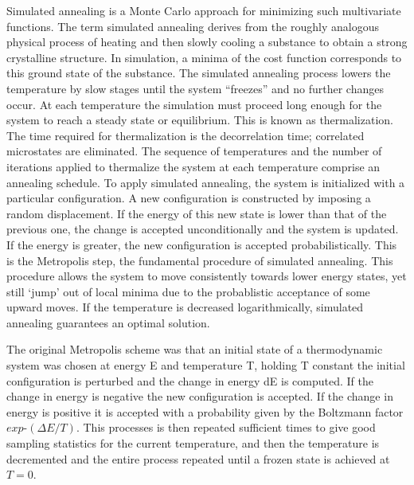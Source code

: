 \documentclass[superscriptaddress,reprint,amsmath,amssymb,aps]{revtex4-1}
\begin{document}

\vspace{.15in}

Simulated annealing is a Monte Carlo approach for minimizing such
multivariate functions. The term simulated annealing derives from the
roughly analogous physical process of heating and then slowly cooling a
substance to obtain a strong crystalline structure. In simulation, a minima
of the cost function corresponds to this ground state of the substance. The
simulated annealing process lowers the temperature by slow stages until the
system ``freezes'' and no further changes occur. At each temperature the
simulation must proceed long enough for the system to reach a steady state
or equilibrium. This is known as thermalization. The time required for
thermalization is the decorrelation time; correlated microstates are
eliminated. The sequence of temperatures and the number of iterations
applied to thermalize the system at each temperature comprise an annealing
schedule.  To apply simulated annealing, the system is initialized with a
particular configuration. A new configuration is constructed by imposing a
random displacement. If the energy of this new state is lower than that of
the previous one, the change is accepted unconditionally and the system is
updated. If the energy is greater, the new configuration is accepted
probabilistically. This is the Metropolis step, the fundamental procedure
of simulated annealing. This procedure allows the system to move
consistently towards lower energy states, yet still ‘jump’ out of local
minima due to the probablistic acceptance of some upward moves. If the
temperature is decreased logarithmically, simulated annealing guarantees an
optimal solution.

The original Metropolis scheme was that an initial state of a thermodynamic
system was chosen at energy E and temperature T, holding T constant the
initial configuration is perturbed and the change in energy dE is computed.
If the change in energy is negative the new configuration is accepted. If
the change in energy is positive it is accepted with a probability given by
the Boltzmann factor $exp ‐(\Delta E/T)$.  This processes is then repeated
sufficient times to give good sampling statistics for the current
temperature, and then the temperature is decremented and the entire process
repeated until a frozen state is achieved at $T=0$.
\end{document}
